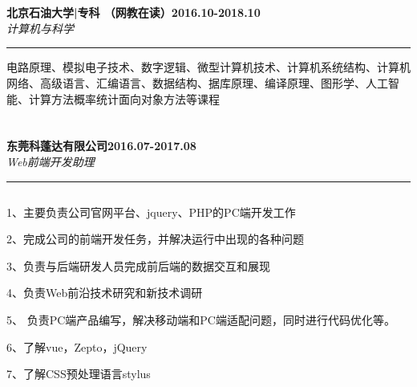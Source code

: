 \documentclass[11pt]{article} %
\begin{document}
 \section{\textsc{}}
\large{\textbf{北京石油大学|专科 （网教在读）\hfill 2016.10-2018.10}}\\
\normalsize
\indent\textit{计算机与科学 \hfill  }
\hrule\smallskip\vspace{-4mm}
 \begin{description}
  \setlength{\itemsep}{1pt}
  \setlength{\parskip}{0pt}
  \setlength{\parsep}{1pt}
  \item[核心课程:]电路原理、模拟电子技术、数字逻辑、微型计算机技术、计算机系统结构、计算机网络、高级语言、汇编语言、数据结构、据库原理、编译原理、图形学、人工智能、计算方法概率统计面向对象方法等课程
  \end{description}

 \section{\textsc{}}
 
\large{\textbf{东莞科蓬达有限公司\hfill 2016.07-2017.08}}\\
\normalsize
\indent\textit{Web前端开发助理 \hfill  }
\hrule\smallskip\vspace{-4mm}
 \begin{description}
  \setlength{\itemsep}{1pt}
  \setlength{\parskip}{0pt}
  \setlength{\parsep}{1pt}
  \item[工作描述:]$ $\\\vspace{-4mm}

1、主要负责公司官网平台、jquery、PHP的PC端开发工作

2、完成公司的前端开发任务，并解决运行中出现的各种问题

3、负责与后端研发人员完成前后端的数据交互和展现

4、负责Web前沿技术研究和新技术调研

5、 负责PC端产品编写，解决移动端和PC端适配问题，同时进行代码优化等。

6、了解vue，Zepto，jQuery

7、了解CSS预处理语言stylus
  \end{description}
\end{document}
